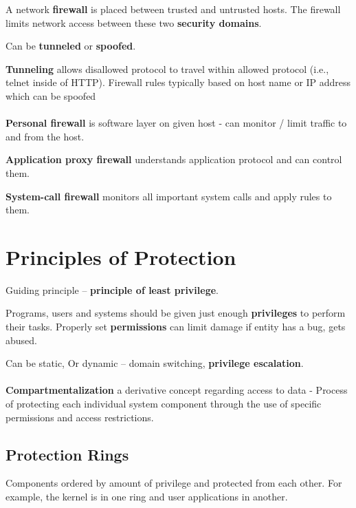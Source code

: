 A network \textbf{firewall} is placed between trusted and untrusted hosts. The firewall limits network access between these two \textbf{security domains}.

Can be \textbf{tunneled} or \textbf{spoofed}. 

\textbf{Tunneling} allows disallowed protocol to travel within allowed
protocol (i.e., telnet inside of HTTP). Firewall rules typically based on host name or IP address which
can be spoofed

\paragraph{}

\textbf{Personal firewall} is software layer on given host - can monitor / limit traffic to and from the host.

\textbf{Application proxy firewall} understands application protocol and can
control them.

\textbf{System-call firewall} monitors all important system calls and apply
rules to them.


\section{Principles of Protection}
Guiding principle – \textbf{principle of least privilege}.

Programs, users and systems should be given just enough \textbf{privileges} to perform their tasks. Properly set \textbf{permissions} can limit damage if entity has a bug, gets abused.

Can be static, Or dynamic – domain switching, \textbf{privilege escalation}.

\paragraph{}
\textbf{Compartmentalization} a derivative concept regarding access to
data  - Process of protecting each individual system component
through the use of specific permissions and access restrictions.

\subsection{Protection Rings}

Components ordered by amount of privilege and protected from each
other. For example, the kernel is in one ring and user applications in
another.

